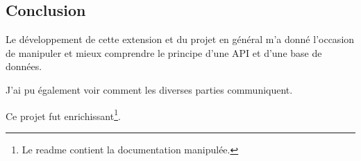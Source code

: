 \subsection{Conclusion}

\begin{flushleft}
Le développement de cette extension et du projet en général m'a donné l'occasion de manipuler et mieux comprendre le principe d'une API et d'une base de données.
\end{flushleft}
\begin{flushleft}
J'ai pu également voir comment les diverses parties communiquent.
\end{flushleft}
\begin{flushleft}
Ce projet fut enrichissant\footnote{Le readme contient la documentation manipulée.}.
\end{flushleft}

